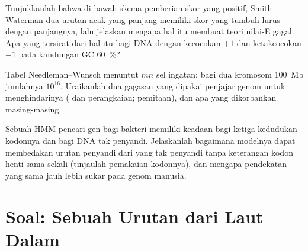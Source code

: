 \begin{exercise}[$\star\star\star$]\label{exo:b3:bioinformatics:10}
Tunjukkanlah bahwa di bawah skema pemberian skor yang  positif,
 Smith--Waterman dua urutan acak yang panjang memiliki skor
yang tumbuh lurus dengan panjangnya, lalu jelaskan mengapa hal itu membuat
teori nilai-E gagal. Apa yang tersirat dari hal itu bagi  DNA dengan
kecocokan $+1$ dan ketakcocokan $-1$ pada kandungan GC \qty{60}{\%}?
\end{exercise}

\begin{exercise}[$\star\star\star$]\label{exo:b3:bioinformatics:11}
Tabel Needleman--Wunsch menuntut $mn$ sel ingatan; bagi dua kromosom
\qty{100}{Mb} jumlahnya $10^{16}$. Uraikanlah dua gagasan yang dipakai
penjajar genom untuk menghindarinya ( dan perangkaian; pemitaan), dan apa
yang dikorbankan masing-masing.
\end{exercise}

\begin{exercise}[$\star\star\star$]\label{exo:b3:bioinformatics:12}
Sebuah HMM pencari gen bagi bakteri memiliki keadaan bagi ketiga kedudukan
kodonnya dan bagi DNA tak penyandi. Jelaskanlah bagaimana modelnya dapat
membedakan urutan penyandi dari yang tak penyandi tanpa keterangan kodon henti
sama sekali (tinjaulah pemakaian kodonnya), dan mengapa pendekatan yang sama
jauh lebih sukar pada genom manusia.
\end{exercise}

\section{Soal: Sebuah Urutan dari Laut Dalam}

